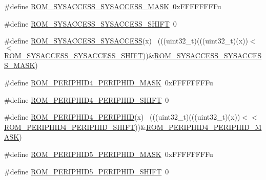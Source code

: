 \begin{DoxyCompactItemize}
\item 
\#define \hyperlink{group___r_o_m___register___masks_gab3acbf5e9fc0f3ad82ae4e0004d0216d}{R\+O\+M\+\_\+\+S\+Y\+S\+A\+C\+C\+E\+S\+S\+\_\+\+S\+Y\+S\+A\+C\+C\+E\+S\+S\+\_\+\+M\+A\+SK}~0x\+F\+F\+F\+F\+F\+F\+F\+Fu
\item 
\#define \hyperlink{group___r_o_m___register___masks_ga3490b2f91c6a67625992dbc90f0e5a27}{R\+O\+M\+\_\+\+S\+Y\+S\+A\+C\+C\+E\+S\+S\+\_\+\+S\+Y\+S\+A\+C\+C\+E\+S\+S\+\_\+\+S\+H\+I\+FT}~0
\item 
\#define \hyperlink{group___r_o_m___register___masks_ga81c24d70e0f959fbd6e8d3cb9aa311cc}{R\+O\+M\+\_\+\+S\+Y\+S\+A\+C\+C\+E\+S\+S\+\_\+\+S\+Y\+S\+A\+C\+C\+E\+SS}(x)                          ~(((uint32\+\_\+t)(((uint32\+\_\+t)(x))$<$$<$\hyperlink{group___r_o_m___register___masks_ga3490b2f91c6a67625992dbc90f0e5a27}{R\+O\+M\+\_\+\+S\+Y\+S\+A\+C\+C\+E\+S\+S\+\_\+\+S\+Y\+S\+A\+C\+C\+E\+S\+S\+\_\+\+S\+H\+I\+FT}))\&\hyperlink{group___r_o_m___register___masks_gab3acbf5e9fc0f3ad82ae4e0004d0216d}{R\+O\+M\+\_\+\+S\+Y\+S\+A\+C\+C\+E\+S\+S\+\_\+\+S\+Y\+S\+A\+C\+C\+E\+S\+S\+\_\+\+M\+A\+SK})
\item 
\#define \hyperlink{group___r_o_m___register___masks_gad17e07925ea552218422be227581a58f}{R\+O\+M\+\_\+\+P\+E\+R\+I\+P\+H\+I\+D4\+\_\+\+P\+E\+R\+I\+P\+H\+I\+D\+\_\+\+M\+A\+SK}~0x\+F\+F\+F\+F\+F\+F\+F\+Fu
\item 
\#define \hyperlink{group___r_o_m___register___masks_ga4ea3b3a45be6eb8eb4372f565af2d5d9}{R\+O\+M\+\_\+\+P\+E\+R\+I\+P\+H\+I\+D4\+\_\+\+P\+E\+R\+I\+P\+H\+I\+D\+\_\+\+S\+H\+I\+FT}~0
\item 
\#define \hyperlink{group___r_o_m___register___masks_gafa1aef93a78a023fc20519a2128d8a2c}{R\+O\+M\+\_\+\+P\+E\+R\+I\+P\+H\+I\+D4\+\_\+\+P\+E\+R\+I\+P\+H\+ID}(x)                            ~(((uint32\+\_\+t)(((uint32\+\_\+t)(x))$<$$<$\hyperlink{group___r_o_m___register___masks_ga4ea3b3a45be6eb8eb4372f565af2d5d9}{R\+O\+M\+\_\+\+P\+E\+R\+I\+P\+H\+I\+D4\+\_\+\+P\+E\+R\+I\+P\+H\+I\+D\+\_\+\+S\+H\+I\+FT}))\&\hyperlink{group___r_o_m___register___masks_gad17e07925ea552218422be227581a58f}{R\+O\+M\+\_\+\+P\+E\+R\+I\+P\+H\+I\+D4\+\_\+\+P\+E\+R\+I\+P\+H\+I\+D\+\_\+\+M\+A\+SK})
\item 
\#define \hyperlink{group___r_o_m___register___masks_ga39e8a3441c79c42651efba9100e653a7}{R\+O\+M\+\_\+\+P\+E\+R\+I\+P\+H\+I\+D5\+\_\+\+P\+E\+R\+I\+P\+H\+I\+D\+\_\+\+M\+A\+SK}~0x\+F\+F\+F\+F\+F\+F\+F\+Fu
\item 
\#define \hyperlink{group___r_o_m___register___masks_ga083194b41cf1109fe5a6e235b2c1f89a}{R\+O\+M\+\_\+\+P\+E\+R\+I\+P\+H\+I\+D5\+\_\+\+P\+E\+R\+I\+P\+H\+I\+D\+\_\+\+S\+H\+I\+FT}~0

\end{DoxyCompactItemize}
